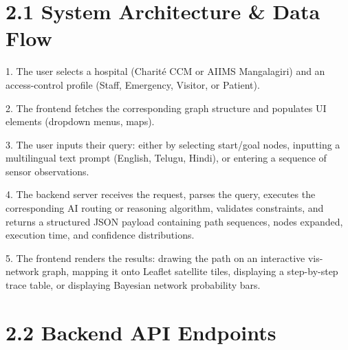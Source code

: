 \documentclass[12pt,a4paper]{report}
\begin{document}
\section{2.1 System Architecture \& Data Flow}

1. The user selects a hospital (Charit\'{e} CCM or AIIMS Mangalagiri) and an access-control profile (Staff, Emergency, Visitor, or Patient).

2. The frontend fetches the corresponding graph structure and populates UI elements (dropdown menus, maps).

3. The user inputs their query: either by selecting start/goal nodes, inputting a multilingual text prompt (English, Telugu, Hindi), or entering a sequence of sensor observations.

4. The backend server receives the request, parses the query, executes the corresponding AI routing or reasoning algorithm, validates constraints, and returns a structured JSON payload containing path sequences, nodes expanded, execution time, and confidence distributions.

5. The frontend renders the results: drawing the path on an interactive vis-network graph, mapping it onto Leaflet satellite tiles, displaying a step-by-step trace table, or displaying Bayesian network probability bars.


\section{2.2 Backend API Endpoints}
\end{document}

